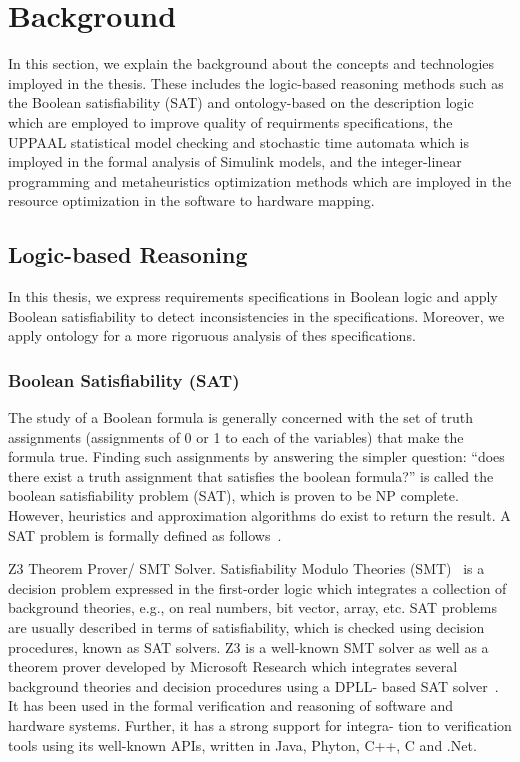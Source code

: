 \chapter{Background}
In this section, we explain the background about the concepts and technologies imployed in the thesis. These includes the logic-based reasoning methods such as the Boolean satisfiability (SAT) and ontology-based on the description logic which are employed to improve quality of requirments specifications, the UPPAAL statistical model checking and stochastic time automata which is imployed in the formal analysis of Simulink models, and the integer-linear programming and metaheuristics optimization methods which are imployed in the resource optimization  in the software to hardware mapping.
\section{Logic-based Reasoning}
In this thesis, we express requirements specifications in  Boolean logic and apply Boolean satisfiability to detect inconsistencies in the specifications. Moreover, we apply ontology for a more rigoruous analysis of thes specifications.
\subsection*{Boolean Satisfiability (SAT)}
The study of a Boolean formula is generally concerned with the set of truth assignments (assignments of 0 or 1 to each of the variables) that make the formula true. Finding such assignments by answering the simpler question: ``does there exist a truth assignment that satisfies the boolean formula?'' is called the boolean satisfiability problem (SAT), which is proven to be NP complete. However, heuristics and approximation algorithms do exist to return the result. A SAT problem is formally defined as follows~\cite{devlin2008satisfiability}.

Z3 Theorem Prover/ SMT Solver. Satisfiability Modulo Theories (SMT)~\cite{Biere2009HandbookSatisfiability} is a decision problem expressed in the first-order logic which integrates a collection of background theories, e.g., on real numbers, bit vector, array, etc. SAT problems are usually described in terms of satisfiability, which is checked using decision procedures, known as SAT solvers. Z3 is a well-known SMT solver as well as a theorem prover developed by Microsoft Research which integrates several background theories and decision procedures using a DPLL- based SAT solver~\cite{DeMoura2008Z3:Solver}. It has been used in the formal verification and reasoning of software and hardware systems. Further, it has a strong support for integra- tion to verification tools using its well-known APIs, written in Java, Phyton, C++, C and .Net.

